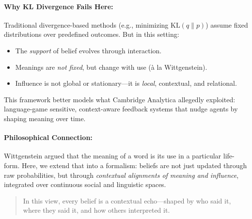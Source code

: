 \paragraph{Why KL Divergence Fails Here:}
Traditional divergence-based methods (e.g., minimizing \( \mathrm{KL}(q \| p) \)) assume fixed distributions over predefined outcomes. But in this setting:
\begin{itemize}
    \item The \textit{support} of belief evolves through interaction.
    \item Meanings are \textit{not fixed}, but change with use (\`a la Wittgenstein).
    \item Influence is not global or stationary—it is \textit{local}, contextual, and relational.
\end{itemize}

This framework better models what Cambridge Analytica allegedly exploited: language-game sensitive, context-aware feedback systems that nudge agents by shaping meaning over time.

\paragraph{Philosophical Connection:}
Wittgenstein argued that the meaning of a word is its use in a particular life-form. Here, we extend that into a formalism: beliefs are not just updated through raw probabilities, but through \emph{contextual alignments of meaning and influence}, integrated over continuous social and linguistic spaces.

\begin{quote}
    In this view, every belief is a contextual echo—shaped by who said it, where they said it, and how others interpreted it.
\end{quote}



